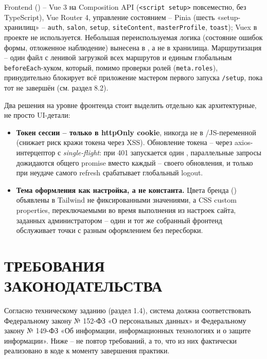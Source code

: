 Frontend () -- Vue 3 на Composition API
(\texttt{<script setup>} повсеместно, без TypeScript), Vue Router 4,
управление состоянием -- Pinia (шесть «setup-хранилищ» --
\texttt{auth}, \texttt{salon}, \texttt{setup}, \texttt{siteContent},
\texttt{masterProfile}, \texttt{toast}); Vuex в проекте не используется.
Небольшая переиспользуемая логика (состояние ошибок формы, отложенное
наблюдение) вынесена в , а не в хранилища.
Маршрутизация -- один файл  с ленивой загрузкой
всех маршрутов и единым глобальным \texttt{beforeEach}-хуком, который,
помимо проверки ролей (\texttt{meta.roles}), принудительно блокирует всё
приложение мастером первого запуска \texttt{/setup}, пока тот не завершён
(см. раздел 8.2).

Два решения на уровне фронтенда стоит выделить отдельно как архитектурные,
не просто UI-детали:

\begin{itemize}
  \item \textbf{Токен сессии -- только в httpOnly cookie}, никогда не в
        /JS-переменной (снижает риск кражи токена через XSS).
        Обновление токена -- через axios-интерцептор с \emph{single-flight}:
        при 401 запускается один ,
        параллельные запросы дожидаются общего promise вместо каждый --
        своего обновления, и только при неудаче самого refresh срабатывает
        глобальный logout.
  \item \textbf{Тема оформления как настройка, а не константа.} Цвета
        бренда ()
        объявлены в Tailwind не фиксированными значениями, а CSS custom
        properties, переключаемыми во время выполнения из настроек сайта,
        заданных администратором -- один и тот же собранный фронтенд
        обслуживает точки с разным оформлением без пересборки.
\end{itemize}

\section{ТРЕБОВАНИЯ ЗАКОНОДАТЕЛЬСТВА}

Согласно техническому заданию (раздел 1.4), система должна соответствовать
Федеральному закону № 152-ФЗ «О персональных данных» и Федеральному закону
№ 149-ФЗ «Об информации, информационных технологиях и о защите
информации». Ниже -- не повтор требований, а то, что из них фактически
реализовано в коде к моменту завершения практики.

